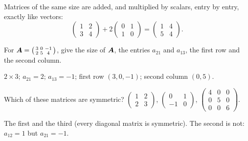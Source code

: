 Matrices of the same size are added, and multiplied by scalars, entry by
entry, exactly like vectors:
\[
  \begin{pmatrix} 1 & 2\\ 3 & 4\end{pmatrix}
  + 2\begin{pmatrix} 0 & 1\\ 1 & 0\end{pmatrix}
  = \begin{pmatrix} 1 & 4\\ 5 & 4\end{pmatrix}.
\]

\sectionexercises

\begin{exercise}
For $\bm{A} = \left(\begin{smallmatrix} 3 & 0 & -1\\ 2 & 5 & 4\end{smallmatrix}\right)$,
give the size of $\bm{A}$, the entries $a_{21}$ and $a_{13}$, the first row and
the second column.
\end{exercise}
\begin{solution}
$2\times3$; $a_{21} = 2$; $a_{13} = -1$; first row $(3, 0, -1)$; second
column $(0, 5)$.
\end{solution}

\begin{exercise}
Which of these matrices are symmetric?
$\left(\begin{smallmatrix} 1 & 2\\ 2 & 3\end{smallmatrix}\right)$,
$\left(\begin{smallmatrix} 0 & 1\\ -1 & 0\end{smallmatrix}\right)$,
$\left(\begin{smallmatrix} 4 & 0 & 0\\ 0 & 5 & 0\\ 0 & 0 & 6\end{smallmatrix}\right)$.
\end{exercise}
\begin{solution}
The first and the third (every diagonal matrix is symmetric). The second is
not: $a_{12} = 1$ but $a_{21} = -1$.
\end{solution}

